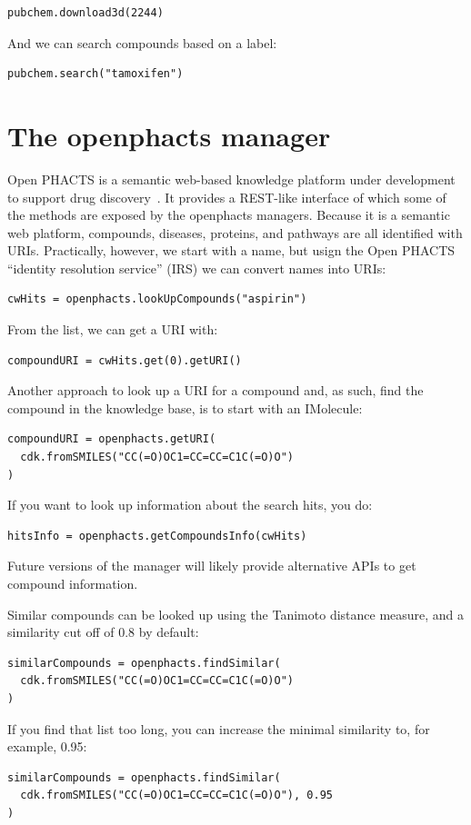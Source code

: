 \documentclass[a5paper, 10pt]{memoir}
\begin{document}
\begin{refsection}
\begin{Verbatim}
pubchem.download3d(2244)
\end{Verbatim}
And we can search compounds based on a label:

\begin{Verbatim}
pubchem.search("tamoxifen")
\end{Verbatim}

\section{The openphacts manager}

Open PHACTS is a semantic web-based knowledge platform under
development to support drug discovery~\cite{Williams2012}. It provides a
REST-like interface of which some of the methods are exposed by the openphacts
managers. Because it is a semantic web platform, compounds, diseases, proteins,
and pathways are all identified with URIs. Practically, however, we start with
a name, but usign the Open PHACTS ``identity resolution service'' (IRS) we can
convert names into URIs:

\begin{Verbatim}
cwHits = openphacts.lookUpCompounds("aspirin")
\end{Verbatim}
From the list, we can get a URI with:

\begin{Verbatim}
compoundURI = cwHits.get(0).getURI()
\end{Verbatim}
Another approach to look up a URI for a compound and, as such, find the
compound in the knowledge base, is to start with an IMolecule:

\begin{Verbatim}
compoundURI = openphacts.getURI(
  cdk.fromSMILES("CC(=O)OC1=CC=CC=C1C(=O)O")
)
\end{Verbatim}
If you want to look up information about the search hits, you do:

\begin{Verbatim}
hitsInfo = openphacts.getCompoundsInfo(cwHits)
\end{Verbatim}
Future versions of the manager will likely provide alternative APIs to get
compound information.

Similar compounds can be looked up using the Tanimoto distance measure, and a
similarity cut off of 0.8 by default:

\begin{Verbatim}
similarCompounds = openphacts.findSimilar(
  cdk.fromSMILES("CC(=O)OC1=CC=CC=C1C(=O)O")
)
\end{Verbatim}
If you find that list too long, you can increase the minimal similarity to, for
example, 0.95:

\begin{Verbatim}
similarCompounds = openphacts.findSimilar(
  cdk.fromSMILES("CC(=O)OC1=CC=CC=C1C(=O)O"), 0.95
)
\end{Verbatim}


\printbibliography[heading=subbibliography]
\end{refsection}


\cleardoublepage
\printindex
\end{document}
